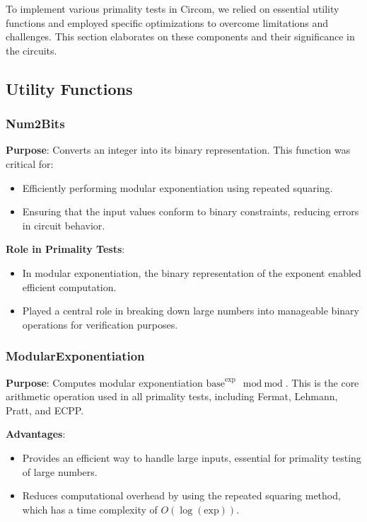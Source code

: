 \documentclass[12pt]{article}
\begin{document}
To implement various primality tests in Circom, we relied on essential utility functions and employed specific optimizations to overcome limitations and challenges. This section elaborates on these components and their significance in the circuits.

\subsection*{Utility Functions}

\subsubsection*{Num2Bits}
\textbf{Purpose}: Converts an integer into its binary representation.  
This function was critical for:
\begin{itemize}
    \item Efficiently performing modular exponentiation using repeated squaring.
    \item Ensuring that the input values conform to binary constraints, reducing errors in circuit behavior.
\end{itemize}

\textbf{Role in Primality Tests}:
\begin{itemize}
    \item In modular exponentiation, the binary representation of the exponent enabled efficient computation.
    \item Played a central role in breaking down large numbers into manageable binary operations for verification purposes.
\end{itemize}

\subsubsection*{ModularExponentiation}
\textbf{Purpose}: Computes modular exponentiation \( \text{base}^{\text{exp}} \mod \text{mod} \).  
This is the core arithmetic operation used in all primality tests, including Fermat, Lehmann, Pratt, and ECPP.

\textbf{Advantages}:
\begin{itemize}
    \item Provides an efficient way to handle large inputs, essential for primality testing of large numbers.
    \item Reduces computational overhead by using the repeated squaring method, which has a time complexity of \( O(\log(\text{exp})) \).
\end{itemize}
\end{document}
